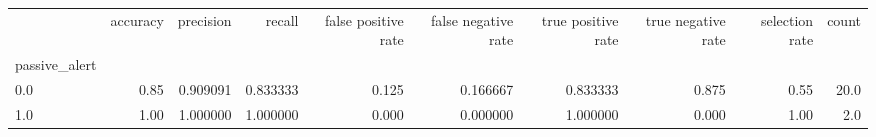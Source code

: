 \begin{tabular}{lrrrrrrrrr}
\toprule
{} &  accuracy &  precision &    recall &  false positive rate &  false negative rate &  true positive rate &  true negative rate &  selection rate &  count \\
passive\_alert &           &            &           &                      &                      &                     &                     &                 &        \\
\midrule
0.0           &      0.85 &   0.909091 &  0.833333 &                0.125 &             0.166667 &            0.833333 &               0.875 &            0.55 &   20.0 \\
1.0           &      1.00 &   1.000000 &  1.000000 &                0.000 &             0.000000 &            1.000000 &               0.000 &            1.00 &    2.0 \\
\bottomrule
\end{tabular}
